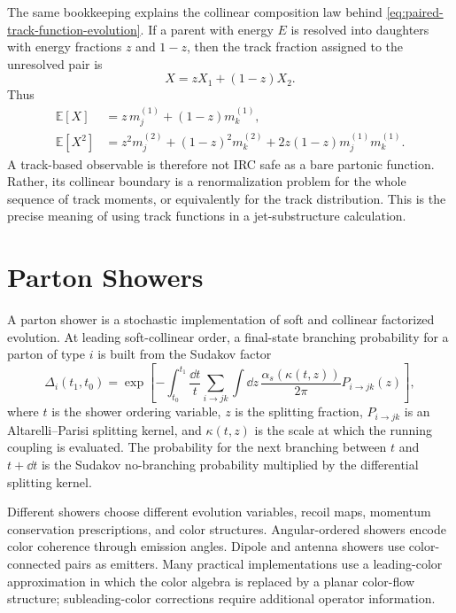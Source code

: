 The same bookkeeping explains the collinear composition law behind
\eqref{eq:paired-track-function-evolution}.  If a parent with energy \(E\)
is resolved into daughters with energy fractions \(z\) and \(1-z\), then the
track fraction assigned to the unresolved pair is
\[
  X=zX_1+(1-z)X_2 .
\]
Thus
\begin{align}
  \mathbb E[X]
  &=
  z\,m_j^{(1)}+(1-z)m_k^{(1)},\\
  \mathbb E[X^2]
  &=
  z^2m_j^{(2)}+(1-z)^2m_k^{(2)}
  +2z(1-z)m_j^{(1)}m_k^{(1)}.
  \label{eq:track-lift-collinear-second-moment}
\end{align}
A track-based observable is therefore not IRC safe as a bare partonic
function.  Rather, its collinear boundary is a renormalization problem for
the whole sequence of track moments, or equivalently for the track
distribution.  This is the precise meaning of using track functions in a
jet-substructure calculation.

\section{Parton Showers}

A parton shower is a stochastic implementation of soft and collinear
factorized evolution.  At leading soft-collinear order, a final-state
branching probability for a parton of type \(i\) is built from the Sudakov
factor
\begin{equation}
  \Delta_i(t_1,t_0)
  =
  \exp\left[
    -\int_{t_0}^{t_1}\frac{\dd t}{t}
    \sum_{i\to jk}
    \int \dd z\,
    \frac{\alpha_s(\kappa(t,z))}{2\pi}
    P_{i\to jk}(z)
  \right],
  \label{eq:parton-shower-sudakov}
\end{equation}
where \(t\) is the shower ordering variable, \(z\) is the splitting fraction,
\(P_{i\to jk}\) is an Altarelli--Parisi splitting kernel, and
\(\kappa(t,z)\) is the scale at which the running coupling is evaluated.
The probability for the next branching between \(t\) and \(t+\dd t\) is the
Sudakov no-branching probability multiplied by the differential splitting
kernel.

Different showers choose different evolution variables, recoil maps, momentum
conservation prescriptions, and color structures.  Angular-ordered showers
encode color coherence through emission angles.  Dipole and antenna showers
use color-connected pairs as emitters.  Many practical implementations use a
leading-color approximation in which the color algebra is replaced by a
planar color-flow structure; subleading-color corrections require additional
operator information.

